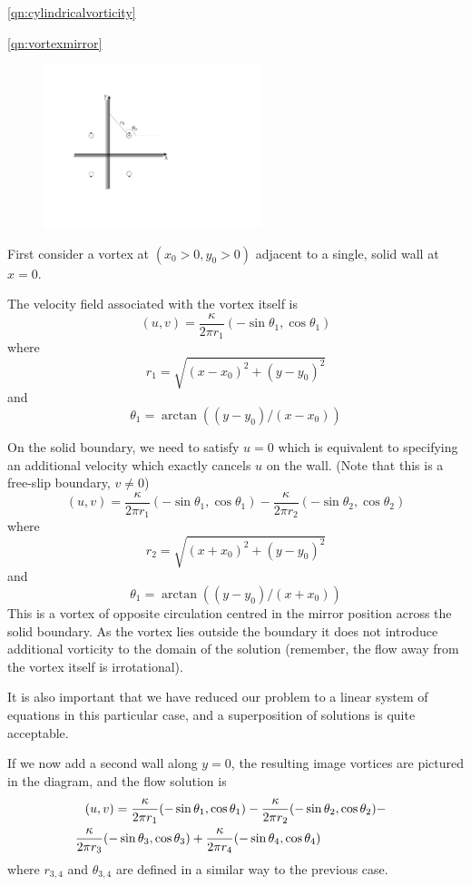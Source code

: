 \documentclass[10pt]{report}
\begin{document}
\begin{answer4}
\begin{questionnumber}{\ref{qn:cylindricalvorticity}}
\end{questionnumber}

\begin{questionnumber}{\ref{qn:vortexmirror}}
\begin{figure}
\includegraphics[width=2.5in]{VortexReflection.pdf}
\end{figure}

First consider a vortex at $(x_{0}>0,y_{0}>0)$ adjacent to a single, solid wall at $x=0$.

The velocity field associated with the vortex itself is
\[
	(u,v) = \frac{\kappa}{2\pi r_{1}}(-\sin\theta_{1}, \cos\theta_{1})
\]
where
\[
r_{1} = \sqrt{ (x-x_{0})^{2} + (y-y_{0})^{2}}
\]
and
\[
\theta_{1} = \arctan\left( (y-y_{0}) / ( x - x_{0}) \right)
\]

On the solid boundary, we need to satisfy $u=0$ which is equivalent to specifying
an additional velocity which exactly cancels $u$ on the wall. (Note that this is
a free-slip boundary, $v\ne 0$)
\[
	(u,v) = \frac{\kappa}{2\pi r_{1}}(-\sin\theta_{1}, \cos\theta_{1}) -
            \frac{\kappa}{2\pi r_{2}}(-\sin\theta_{2}, \cos\theta_{2})
\]
where
\[
r_{2} = \sqrt{ (x+x_{0})^{2} + (y-y_{0})^{2}}
\]
and
\[
\theta_{1} = \arctan\left( (y-y_{0}) / ( x + x_{0}) \right)
\]
This is a vortex of opposite circulation centred in the mirror position across the
solid boundary. As the vortex lies outside the boundary it does not introduce additional
vorticity to the domain of the solution (remember, the flow away from the vortex itself
is irrotational).

It is also important that we have reduced our problem to a linear system of equations in this particular case, and a superposition of solutions is quite acceptable.

If we now add a second wall along $y=0$, the resulting image vortices are pictured
in the diagram, and the flow solution is
\begin{multline*}
		(u,v) = \frac{\kappa}{2\pi r_{1}}(-\sin\theta_{1}, \cos\theta_{1}) -
                \frac{\kappa}{2\pi r_{2}}(-\sin\theta_{2}, \cos\theta_{2}) -\\
                \frac{\kappa}{2\pi r_{3}}(-\sin\theta_{3}, \cos\theta_{3}) +
                \frac{\kappa}{2\pi r_{4}}(-\sin\theta_{4}, \cos\theta_{4}) \mbox{\hspace{2.1cm}}
\end{multline*}
where $r_{3,4}$ and $\theta_{{3,4}}$ are defined in a similar way to the previous case.


\end{questionnumber}
\end{answer4}
\end{document}
